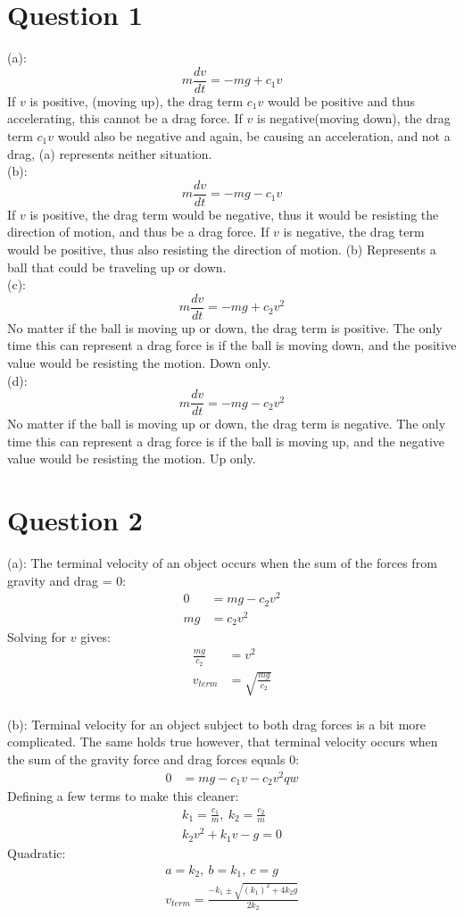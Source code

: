 \documentclass[a4paper,12pt]{article}
\begin{document}
\section*{Question 1}


(a): \[m\frac{dv}{dt}=-mg+c_1v\] 
If $v$ is positive, (moving up), the drag term $c_1v$ would be positive and thus accelerating, this cannot be a drag force.  If $v$ is negative(moving down), the drag term $c_1v$ would also be negative and again, be causing an acceleration, and not a drag, (a) represents neither situation.
\\
(b):\[m\frac{dv}{dt}=-mg-c_1v\]
If $v$ is positive, the drag term would be negative, thus it would be resisting the direction of motion, and thus be a drag force.  If $v$ is negative, the drag term would be positive, thus also resisting the direction of motion. (b) Represents a ball that could be traveling up or down.
\\
(c):\[m\frac{dv}{dt}=-mg+c_2v^2\] 
No matter if the ball is moving up or down, the drag term is positive.  The only time this can represent a drag force is if the ball is moving down, and the positive value would be resisting the motion.  Down only.
\\
(d):\[m\frac{dv}{dt}=-mg-c_2v^2\]
No matter if the ball is moving up or down, the drag term is negative.  The only time this can represent a drag force is if the ball is moving up, and the negative value would be resisting the motion. Up only.
\newpage
\section*{Question 2}
(a): The terminal velocity of an object occurs when the sum of the forces from gravity and drag = 0:
\begin{align*}
0&=mg-c_2v^2\\
mg&=c_2v^2
\end{align*}
Solving for $v$ gives:
\begin{align*}
\frac{mg}{c_2}&=v^2\\
v_{term}&=\sqrt{\frac{mg}{c_2}}
\end{align*}
\\
(b): Terminal velocity for an object subject to both drag forces is a bit more complicated.  The same holds true however, that terminal velocity occurs when the sum of the gravity force and drag forces equals 0:
\begin{align*}
0&=mg-c_1v-c_2v^2
 qw\end{align*}
Defining a few terms to make this cleaner:
\begin{align*}
k_1=\frac{c_1}{m},\ k_2=\frac{c_2}{m}\\
k_2v^2+k_1v-g=0
\end{align*}
Quadratic:
\begin{align*}
a=k_2,\ b=k_1,\ c=g\\
v_{term}=\frac{-k_1\pm\sqrt{(k_1)^2+4k_2g}}{2k_2}
\end{align*}
\end{document}
